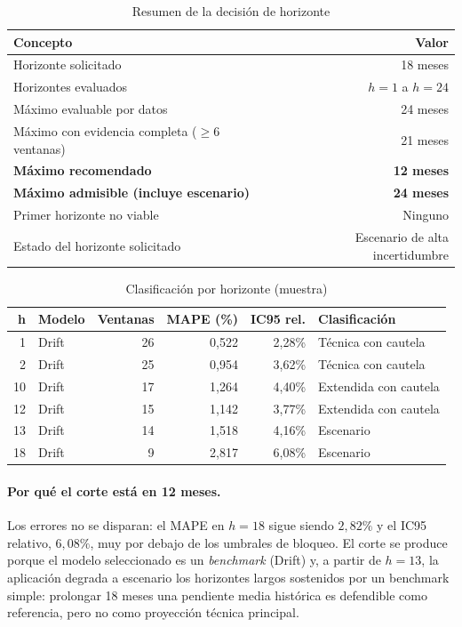 \documentclass[11pt,letterpaper]{article}
\begin{document}
\begin{table}[H]
\centering
\caption{Resumen de la decisión de horizonte}
\begin{tabular}{@{}lr@{}}
\toprule
\textbf{Concepto} & \textbf{Valor} \\
\midrule
Horizonte solicitado & 18 meses \\
Horizontes evaluados & \(h=1\) a \(h=24\) \\
Máximo evaluable por datos & 24 meses \\
Máximo con evidencia completa (\(\geq 6\) ventanas) & 21 meses \\
\textbf{Máximo recomendado} & \textbf{12 meses} \\
\textbf{Máximo admisible (incluye escenario)} & \textbf{24 meses} \\
Primer horizonte no viable & Ninguno \\
Estado del horizonte solicitado & Escenario de alta incertidumbre \\
\bottomrule
\end{tabular}
\end{table}

\begin{table}[H]
\centering
\caption{Clasificación por horizonte (muestra)}
\begin{tabular}{@{}rlrrrl@{}}
\toprule
\textbf{h} & \textbf{Modelo} & \textbf{Ventanas} & \textbf{MAPE (\%)} & \textbf{IC95 rel.} & \textbf{Clasificación} \\
\midrule
1 & Drift & 26 & 0{,}522 & 2{,}28\% & Técnica con cautela \\
2 & Drift & 25 & 0{,}954 & 3{,}62\% & Técnica con cautela \\
10 & Drift & 17 & 1{,}264 & 4{,}40\% & Extendida con cautela \\
12 & Drift & 15 & 1{,}142 & 3{,}77\% & Extendida con cautela \\
13 & Drift & 14 & 1{,}518 & 4{,}16\% & Escenario \\
18 & Drift & 9 & 2{,}817 & 6{,}08\% & Escenario \\
\bottomrule
\end{tabular}
\end{table}

\paragraph{Por qué el corte está en 12 meses.} Los errores no se disparan: el
MAPE en \(h=18\) sigue siendo \(2{,}82\%\) y el IC95 relativo, \(6{,}08\%\),
muy por debajo de los umbrales de bloqueo. El corte se produce porque el modelo
seleccionado es un \emph{benchmark} (Drift) y, a partir de \(h=13\), la
aplicación degrada a escenario los horizontes largos sostenidos por un
benchmark simple: prolongar 18 meses una pendiente media histórica es
defendible como referencia, pero no como proyección técnica principal.
\end{document}
